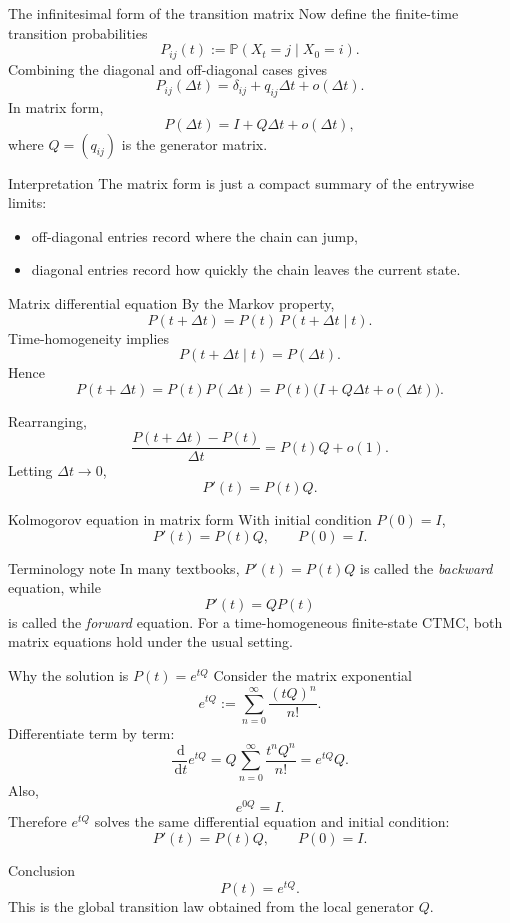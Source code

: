 \documentclass[aspectratio=169,professionalfonts]{beamer}
\newcommand{\Prob}{\mathbb{P}}
\newcommand{\dd}{\,\mathrm{d}}
\begin{document}
\begin{frame}{The infinitesimal form of the transition matrix}
\small
Now define the finite-time transition probabilities
\[
P_{ij}(t):=\Prob(X_t=j\mid X_0=i).
\]
Combining the diagonal and off-diagonal cases gives
\[
P_{ij}(\Delta t)=\delta_{ij}+q_{ij}\Delta t+o(\Delta t).
\]
In matrix form,
\[
P(\Delta t)=I+Q\Delta t+o(\Delta t),
\]
where $Q=(q_{ij})$ is the generator matrix.

\begin{block}{Interpretation}
The matrix form is just a compact summary of the entrywise limits:
\begin{itemize}
  \item off-diagonal entries record where the chain can jump,
  \item diagonal entries record how quickly the chain leaves the current state.
\end{itemize}
\end{block}
\end{frame}

\begin{frame}{Matrix differential equation}
\small
By the Markov property,
\[
P(t+\Delta t)=P(t)\,P(t+\Delta t\mid t).
\]
Time-homogeneity implies
\[
P(t+\Delta t\mid t)=P(\Delta t).
\]
Hence
\[
P(t+\Delta t)=P(t)P(\Delta t)=P(t)\bigl(I+Q\Delta t+o(\Delta t)\bigr).
\]

Rearranging,
\[
\frac{P(t+\Delta t)-P(t)}{\Delta t}=P(t)Q+o(1).
\]
Letting $\Delta t\to 0$,
\[
P'(t)=P(t)Q.
\]

\begin{alertblock}{Kolmogorov equation in matrix form}
With initial condition $P(0)=I$,
\[
P'(t)=P(t)Q,\qquad P(0)=I.
\]
\end{alertblock}

\begin{block}{Terminology note}
In many textbooks, $P'(t)=P(t)Q$ is called the \emph{backward} equation, while
\[
P'(t)=QP(t)
\]
is called the \emph{forward} equation. For a time-homogeneous finite-state CTMC, both matrix equations hold under the usual setting.
\end{block}
\end{frame}

\begin{frame}{Why the solution is $P(t)=e^{tQ}$}
\small
Consider the matrix exponential
\[
e^{tQ}:=\sum_{n=0}^{\infty}\frac{(tQ)^n}{n!}.
\]
Differentiate term by term:
\[
\frac{\dd}{\dd t}e^{tQ}
=Q\sum_{n=0}^{\infty}\frac{t^nQ^n}{n!}
=e^{tQ}Q.
\]
Also,
\[
e^{0Q}=I.
\]
Therefore $e^{tQ}$ solves the same differential equation and initial condition:
\[
P'(t)=P(t)Q,\qquad P(0)=I.
\]

\begin{block}{Conclusion}
\[
P(t)=e^{tQ}.
\]
This is the global transition law obtained from the local generator $Q$.
\end{block}
\end{frame}
\end{document}
